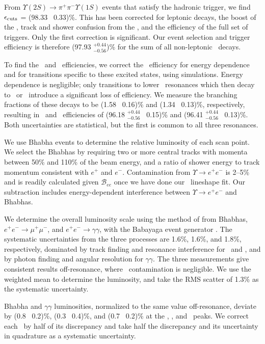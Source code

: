\documentclass[aps,prl,twocolumn,superscriptaddress,showpacs,floatfix]{revtex4}
\begin{document}
From $\Upsilon(2S) \to \pi^+\pi^- \Upsilon(1S)$ events that satisfy
the hadronic trigger, we find $\epsilon_{\mbox{\scriptsize cuts}}$ = (98.33 \PM\ 0.33)\%.  This
has been corrected for leptonic decays, the boost of the \us, track
and shower confusion from the \pipi, and the efficiency of the full
set of triggers.  Only the first correction is significant.  Our event
selection and trigger efficiency is therefore (97.93
$^{+0.44}_{-0.56}$)\% for the sum of all non-leptonic \us\ decays.

To find the \uss\ and \usss\ efficiencies, we correct the \us\
efficiency for energy dependence and for transitions specific to these
excited states, using simulations.  Energy dependence is negligible;
only transitions to lower \ups\ resonances which then decay to \ee\ or
\mm\ introduce a significant loss of efficiency.  We measure the
branching fractions of these decays to be (1.58 \PM\ 0.16)\% and (1.34
\PM\ 0.13)\%, respectively, resulting in \uss\ and \usss\ efficiencies
of (96.18 $^{+0.44}_{-0.56}$ \PM\ 0.15)\% and (96.41
$^{+0.44}_{-0.56}$ \PM\ 0.13)\%.  Both uncertainties are statistical,
but the first is common to all three resonances.

We use Bhabha events to determine the relative luminosity of each scan
point.  We select the Bhabhas by requiring two or more central tracks
with momenta between 50\% and 110\% of the beam energy, and a ratio of
shower energy to track momentum consistent with $e^+$ and $e^-$.
Contamination from $\Upsilon \to e^+e^-$ is 2--5\% and is readily
calculated given ${\mathcal B}_{ee}$ once we have done our \ups\
lineshape fit.  Our subtraction includes energy-dependent interference
between $\Upsilon \to e^+e^-$ and Bhabhas.

We determine the overall luminosity scale using the method of
\cite{oldlumi} from Bhabhas, $e^+e^- \to \mu^+\mu^-$, and $e^+e^- \to
\gamma\gamma$, with the {\textsc Babayaga} event generator
\cite{babayaga}.  The systematic uncertainties from the three
processes are 1.6\%, 1.6\%, and 1.8\%, respectively, dominated by
track finding and resonance interference for \ee\ and \mm, and by
photon finding and angular resolution for $\gamma\gamma$.  The three
measurements give consistent results off-resonance, where \ups\
contamination is negligible.  We use the weighted mean to determine
the luminosity, and take the RMS scatter of 1.3\% as the systematic
uncertainty.

Bhabha and $\gamma\gamma$ luminosities, normalized to the same value
off-resonance, deviate by (0.8 \PM\ 0.2)\%, (0.3 \PM\ 0.4)\%, and (0.7
\PM\ 0.2)\% at the \us, \uss, and \usss\ peaks.  We correct each \gee\
by half of its discrepancy and take half the discrepancy and its
uncertainty in quadrature as a systematic uncertainty.
\end{document}
